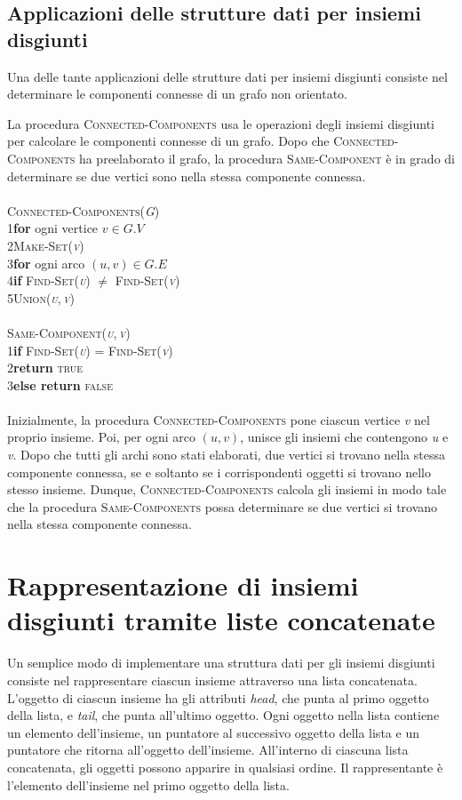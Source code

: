 \documentclass[10pt, a4paper]{report}
\newcommand\firsttab[1][0.5cm]{\hspace*{#1}}
\newcommand\secondtab[1][1cm]{\hspace*{#1}}
\newcommand\thirdtab[1][1.5cm]{\hspace*{#1}}
\begin{document}
\subsection{Applicazioni delle strutture dati per insiemi disgiunti}
Una delle tante applicazioni delle strutture dati per insiemi disgiunti consiste nel determinare le componenti connesse di un grafo non orientato.

La procedura \textsc{Connected-Components} usa le operazioni degli insiemi disgiunti per calcolare le componenti connesse di un grafo. Dopo che \textsc{Connected-Components} ha preelaborato il grafo, la procedura \textsc{Same-Component} è in grado di determinare se due vertici sono nella stessa componente connessa.\\\\
\textsc{Connected-Components(\textit{G})}\\
1\firsttab\textbf{for} ogni vertice $v \in G.V$\\
2\secondtab\textsc{Make-Set(\textit{v})}\\
3\firsttab\textbf{for} ogni arco $(u,v) \in G.E$\\
4\secondtab\textbf{if} \textsc{Find-Set(\textit{u})} $\neq$ \textsc{Find-Set(\textit{v})}\\
5\thirdtab\textsc{Union(\textit{u},\,\textit{v})}\\\\
\textsc{Same-Component(\textit{u},\,\textit{v})}\\
1\firsttab\textbf{if} \textsc{Find-Set(\textit{u})} = \textsc{Find-Set(\textit{v})}\\
2\secondtab\textbf{return} \textsc{true}\\
3\firsttab\textbf{else return} \textsc{false}\\\\
Inizialmente, la procedura \textsc{Connected-Components} pone ciascun vertice \textit{v} nel proprio insieme. Poi, per ogni arco $(u,v)$, unisce gli insiemi che contengono \textit{u} e \textit{v}. Dopo che tutti gli archi sono stati elaborati, due vertici si trovano nella stessa componente connessa, se e soltanto se i corrispondenti oggetti si trovano nello stesso insieme. Dunque, \textsc{Connected-Components} calcola gli insiemi in modo tale che la procedura \textsc{Same-Components} possa determinare se due vertici si trovano nella stessa componente connessa.
\section{Rappresentazione di insiemi disgiunti tramite liste concatenate}
Un semplice modo di implementare una struttura dati per gli insiemi disgiunti consiste nel rappresentare ciascun insieme attraverso una lista concatenata. L'oggetto di ciascun insieme ha gli attributi \textit{head}, che punta al primo oggetto della lista, e \textit{tail}, che punta all'ultimo oggetto. Ogni oggetto nella lista contiene un elemento dell'insieme, un puntatore al successivo oggetto della lista e un puntatore che ritorna all'oggetto dell'insieme. All'interno di ciascuna lista concatenata, gli oggetti possono apparire in qualsiasi ordine. Il rappresentante è l'elemento dell'insieme nel primo oggetto della lista.
\end{document}
